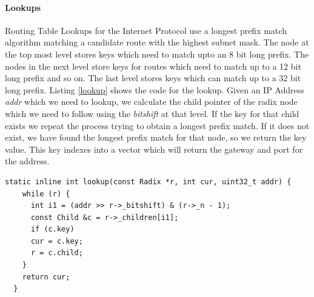 \documentclass{article}
\begin{document}
\paragraph{Lookups}
Routing Table Lookups for the Internet Protocol use a longest prefix match algorithm matching a candidate route with the highest subnet mask. The node at the top most level stores keys which need to match upto an 8 bit long prefix. The nodes in the next level store keys for routes which need to match up to a 12 bit long prefix and so on. The last level stores keys which can match up to a 32 bit long prefix. Listing \ref{lookup} shows the code for the lookup. Given an IP Address \emph{addr} which we need to lookup, we calculate the child pointer of the radix node which we need to follow using the \emph{bitshift} at that level. If the key for that child exists we repeat the process trying to obtain a longest prefix match. If it does not exist, we have found the longest prefix match for that node, so we return the key value. This key indexes into a vector which will return the gateway and port for the address.
\begin{lstlisting}[caption = The lookup function, label=lookup]
  static inline int lookup(const Radix *r, int cur, uint32_t addr) {
    while (r) {
      int i1 = (addr >> r->_bitshift) & (r->_n - 1);
      const Child &c = r->_children[i1];
      if (c.key)
      cur = c.key;
      r = c.child;
    }
    return cur;
  }
\end{lstlisting}
\end{document}
